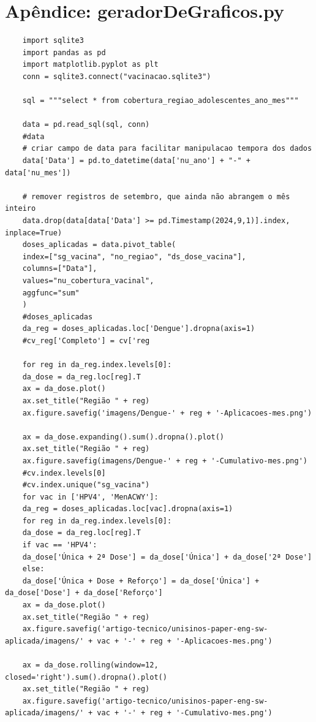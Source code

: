 \documentclass[12pt]{article}
\begin{document}
\section{Apêndice: geradorDeGraficos.py}

\begin{verbatim}
    import sqlite3
    import pandas as pd
    import matplotlib.pyplot as plt
    conn = sqlite3.connect("vacinacao.sqlite3")

    sql = """select * from cobertura_regiao_adolescentes_ano_mes"""

    data = pd.read_sql(sql, conn)
    #data
    # criar campo de data para facilitar manipulacao tempora dos dados
    data['Data'] = pd.to_datetime(data['nu_ano'] + "-" + data['nu_mes'])

    # remover registros de setembro, que ainda não abrangem o mês inteiro
    data.drop(data[data['Data'] >= pd.Timestamp(2024,9,1)].index, inplace=True)
    doses_aplicadas = data.pivot_table(
    index=["sg_vacina", "no_regiao", "ds_dose_vacina"],
    columns=["Data"],
    values="nu_cobertura_vacinal",
    aggfunc="sum"
    )
    #doses_aplicadas
    da_reg = doses_aplicadas.loc['Dengue'].dropna(axis=1)
    #cv_reg['Completo'] = cv['reg

    for reg in da_reg.index.levels[0]:
    da_dose = da_reg.loc[reg].T
    ax = da_dose.plot()
    ax.set_title("Região " + reg)
    ax.figure.savefig('imagens/Dengue-' + reg + '-Aplicacoes-mes.png')

    ax = da_dose.expanding().sum().dropna().plot()
    ax.set_title("Região " + reg)
    ax.figure.savefig(imagens/Dengue-' + reg + '-Cumulativo-mes.png')
    #cv.index.levels[0]
    #cv.index.unique("sg_vacina")
    for vac in ['HPV4', 'MenACWY']:
    da_reg = doses_aplicadas.loc[vac].dropna(axis=1)
    for reg in da_reg.index.levels[0]:
    da_dose = da_reg.loc[reg].T
    if vac == 'HPV4':
    da_dose['Única + 2ª Dose'] = da_dose['Única'] + da_dose['2ª Dose']
    else:
    da_dose['Única + Dose + Reforço'] = da_dose['Única'] + da_dose['Dose'] + da_dose['Reforço']
    ax = da_dose.plot()
    ax.set_title("Região " + reg)
    ax.figure.savefig('artigo-tecnico/unisinos-paper-eng-sw-aplicada/imagens/' + vac + '-' + reg + '-Aplicacoes-mes.png')

    ax = da_dose.rolling(window=12, closed='right').sum().dropna().plot()
    ax.set_title("Região " + reg)
    ax.figure.savefig('artigo-tecnico/unisinos-paper-eng-sw-aplicada/imagens/' + vac + '-' + reg + '-Cumulativo-mes.png')
\end{verbatim}
\end{document}
